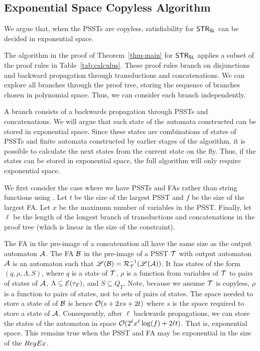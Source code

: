 
\subsection{Exponential Space Copyless Algorithm}
\label{sec:appendix}

We argue that, when the PSSTs are copyless, satisfiability for $\mathsf{STR}_{\mathsf{SL}}$ can be decided in exponential space.

The algorithm in the proof of Theorem~\ref{thm-main} for $\mathsf{STR}_{\mathsf{SL}}$ applies a subset of the proof rules in Table~\ref{tab:calculus}. These proof rules branch on disjunctions and backward propagation through transductions and concatenations. We can explore all branches through the proof tree, storing the sequence of branches chosen in polynomial space. Thus, we can consider each branch independently.

A branch consists of a backwards propagation through PSSTs and concatenations. We will argue that each state of the automata constructed can be stored in exponential space.
Since these states are combinations of states of PSSTs and finite automata constructed by earlier stages of the algorithm, it is possible to calculate the next states from the current state on the fly.
Thus, if the states can be stored in exponential space, the full algorithm will only require exponential space.

We first consider the case where we have PSSTs and FAs rather than string functions using \regexp{}.
Let $t$ be the size of the largest PSST and $f$ be the size of the largest FA.
Let $x$ be the maximum number of variables in the PSST.
Finally, let $\ell$ be the length of the longest branch of transductions and concatenations in the proof tree (which is linear in the size of the constraint).

The FA in the pre-image of a concatenation all have the same size as the output automaton $\mathcal{A}$.
The FA $\mathcal{B}$ in the pre-image of a PSST $\mathcal{T}$ with output automaton $\mathcal{A}$ is an automaton such that
$\mathscr{L}(\mathcal{B}) = \mathcal{R}^{-1}_{\mathcal{T}}(\mathscr{L}(\mathcal{A}))$.
It has states of the form
$(q, \rho, \Lambda, S)$,
where
    $q$ is a state of $\mathcal{T}$,
    $\rho$ is a function from variables of $\mathcal{T}$ to pairs of states of $\mathcal{A}$,
    $\Lambda \subseteq \mathcal{E}(\tau_T)$, and
    $S \subseteq Q_T$.
Note, because we assume $\mathcal{T}$ is copyless, $\rho$ is a function to pairs of states, not to sets of pairs of states.
The space needed to store a state of of $\mathcal{B}$ is hence
$\mathcal{O}(s + 2 x s + 2 t)$
where $s$ is the space required to store a state of $\mathcal{A}$.
Consequently, after $\ell$ backwards propagations, we can store the states of the automaton in space
$\mathcal{O}(2^\ell x^\ell \log(f) + 2 \ell t)$.
That is, exponential space.
This remains true when the PSST and FA may be exponential in the size of the ${RegEx}$.




